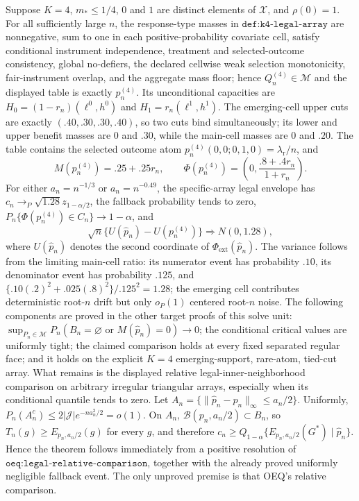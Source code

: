 Suppose \(K=4\), \(m_*\le1/4\), \(0\) and \(1\) are distinct elements of \(\mathcal X\), and \(\rho(0)=1\). For all sufficiently large \(n\), the response-type masses in \(\texttt{def:k4-legal-array}\) are nonnegative, sum to one in each positive-probability covariate cell, satisfy conditional instrument independence, treatment and selected-outcome consistency, global no-defiers, the declared cellwise weak selection monotonicity, fair-instrument overlap, and the aggregate mass floor; hence \(Q_n^{(4)}\in\mathcal M\) and the displayed table is exactly \(p_n^{(4)}\). Its unconditional capacities are \(H_0=(1-r_n)(\ell^0,h^0)\) and \(H_1=r_n(\ell^1,h^1)\). The emerging-cell upper cuts are exactly \((.40,.30,.30,.40)\), so two cuts bind simultaneously; its lower and upper benefit masses are \(0\) and \(.30\), while the main-cell masses are \(0\) and \(.20\). The table contains the selected outcome atom \(p_n^{(4)}(0,0;0,1,0)=\lambda_{\mathrm r}/n\), and
\[
M(p_n^{(4)})=.25+.25r_n,
\qquad
\Phi(p_n^{(4)})=\left(0,\frac{.8+.4r_n}{1+r_n}\right).
\]
For either \(a_n=n^{-1/3}\) or \(a_n=n^{-0.49}\), the specific-array legal envelope has \(c_n\to_P\sqrt{1.28}z_{1-\alpha/2}\), the fallback probability tends to zero, \(P_n\{\Phi(p_n^{(4)})\in C_n\}\to1-\alpha\), and
\[
\sqrt n\{U(\widehat p_n)-U(p_n^{(4)})\}\Rightarrow N(0,1.28),
\]
where \(U(\widehat p_n)\) denotes the second coordinate of \(\Phi_{\mathrm{ext}}(\widehat p_n)\). The variance follows from the limiting main-cell ratio: its numerator event has probability \(.10\), its denominator event has probability \(.125\), and \(\{.10(.2)^2+.025(.8)^2\}/.125^2=1.28\); the emerging cell contributes deterministic root-\(n\) drift but only \(o_P(1)\) centered root-\(n\) noise.
The following components are proved in the other target proofs of this solve unit: \(\sup_{P_n\in\mathcal M}P_n(B_n=\varnothing\text{ or }M(\widehat p_n)=0)\to0\); the conditional critical values are uniformly tight; the claimed comparison holds at every fixed separated regular face; and it holds on the explicit \(K=4\) emerging-support, rare-atom, tied-cut array.  What remains is the displayed relative legal-inner-neighborhood comparison on arbitrary irregular triangular arrays, especially when its conditional quantile tends to zero.
Let \(A_n=\{\|\widehat p_n-p_n\|_\infty\le a_n/2\}\).  Uniformly, \(P_n(A_n^c)\le2|\mathcal J|e^{-na_n^2/2}=o(1)\).  On \(A_n\), \(\mathcal B(p_n,a_n/2)\subset B_n\), so \(T_n(g)\ge E_{p_n,a_n/2}(g)\) for every \(g\), and therefore \(c_n\ge Q_{1-\alpha}\{E_{p_n,a_n/2}(G^*)\mid\widehat p_n\}\).  Hence the theorem follows immediately from a positive resolution of \(\texttt{oeq:legal-relative-comparison}\), together with the already proved uniformly negligible fallback event.  The only unproved premise is that OEQ's relative comparison.
